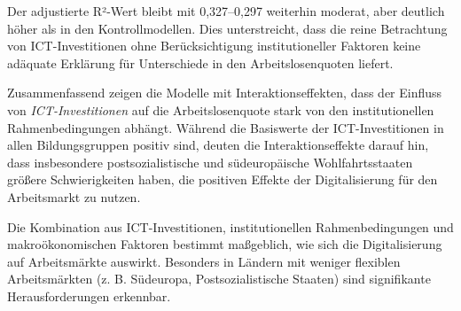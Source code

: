 Der adjustierte R²-Wert bleibt mit 0,327–0,297 weiterhin moderat, aber deutlich höher als 
in den Kontrollmodellen. Dies unterstreicht, dass die reine Betrachtung von ICT-Investitionen 
ohne Berücksichtigung institutioneller Faktoren keine adäquate Erklärung für Unterschiede in 
den Arbeitslosenquoten liefert.

Zusammenfassend zeigen die Modelle mit Interaktionseffekten, dass der Einfluss von 
\textit{\ac{ICT}-Investitionen} auf die Arbeitslosenquote stark von den institutionellen 
Rahmenbedingungen abhängt. Während die Basiswerte der ICT-Investitionen in allen 
Bildungsgruppen positiv sind, deuten die Interaktionseffekte darauf hin, dass insbesondere 
postsozialistische und südeuropäische Wohlfahrtsstaaten größere Schwierigkeiten haben, 
die positiven Effekte der Digitalisierung für den Arbeitsmarkt zu nutzen. 

Die Kombination aus ICT-Investitionen, institutionellen Rahmenbedingungen und 
makroökonomischen Faktoren bestimmt maßgeblich, wie sich die Digitalisierung auf 
Arbeitsmärkte auswirkt. Besonders in Ländern mit weniger flexiblen Arbeitsmärkten 
(z. B. Südeuropa, Postsozialistische Staaten) sind signifikante Herausforderungen erkennbar.
